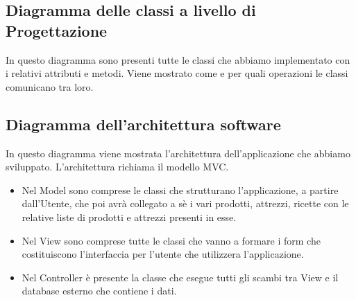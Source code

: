 \documentclass[a4paper, titlepage]{article}
\begin{document}
\subsection{Diagramma delle classi a livello di Progettazione}
In questo diagramma sono presenti tutte le classi che abbiamo implementato con i relativi attributi e metodi. Viene mostrato come e per quali operazioni le classi comunicano tra loro.
\subsection{Diagramma dell'architettura software}
In questo diagramma viene mostrata l'architettura dell'applicazione che abbiamo sviluppato.
L'architettura richiama il modello MVC.
\begin{itemize}
    \item Nel Model sono comprese le classi che strutturano l'applicazione, a partire dall'Utente, che poi avrà collegato a sè i vari prodotti, attrezzi, ricette con le relative liste di prodotti e attrezzi presenti in esse.
    \item Nel View sono comprese tutte le classi che vanno a formare i form che costituiscono l'interfaccia per l'utente che utilizzera l'applicazione.
    \item Nel Controller è presente la classe che esegue tutti gli scambi tra View e il database esterno che contiene i dati.
\end{itemize}

\newpage
\end{document}
